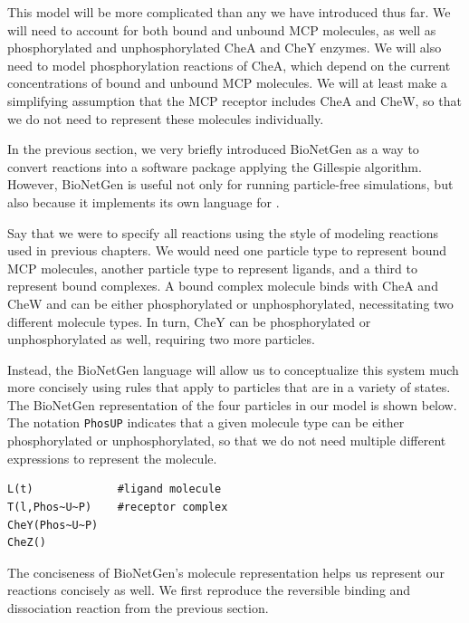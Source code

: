 This model will be more complicated than any we have introduced thus far. We will need to account for both bound and unbound MCP molecules, as well as phosphorylated and unphosphorylated CheA and CheY enzymes. We will also need to model phosphorylation reactions of CheA, which depend on the current concentrations of bound and unbound MCP molecules. We will at least make a simplifying assumption that the MCP receptor includes CheA and CheW, so that we do not need to represent these molecules individually.

In the previous section, we very briefly introduced BioNetGen as a way to convert reactions into a software package applying the Gillespie algorithm. However, BioNetGen is useful not only for running particle-free simulations, but also because it implements its own language for .

Say that we were to specify all reactions using the style of modeling reactions used in previous chapters. We would need one particle type to represent bound MCP molecules, another particle type to represent ligands, and a third to represent bound complexes. A bound complex molecule binds with CheA and CheW and can be either phosphorylated or unphosphorylated, necessitating two different molecule types. In turn, CheY can be phosphorylated or unphosphorylated as well, requiring two more particles.

Instead, the BioNetGen language will allow us to conceptualize this system much more concisely using rules that apply to particles that are in a variety of states. The BioNetGen representation of the four particles in our model is shown below. The notation \texttt{Phos\texttildelow U\texttildelow P} indicates that a given molecule type can be either phosphorylated or unphosphorylated, so that we do not need multiple different expressions to represent the molecule.

\begin{verbatim}
L(t)             #ligand molecule
T(l,Phos~U~P)    #receptor complex
CheY(Phos~U~P) 
CheZ()
\end{verbatim}

The conciseness of BioNetGen's molecule representation helps us represent our reactions concisely as well. We first reproduce the reversible binding and dissociation reaction from the previous section.

